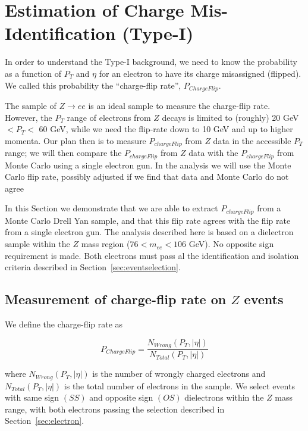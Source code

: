 \section{Estimation of Charge Mis-Identification (Type-I)}
\label{sec:chargemisid}

In order to understand the Type-I background, we need to know the 
probability as a function of $P_T$ and $\eta$ for an electron
to have its charge misassigned (flipped).  We called this 
probability the ``charge-flip rate'', $P_{ChargeFlip}$.


The sample of $Z \to ee$ is an ideal sample to measure the charge-flip rate.
However, the $P_T$ range of electrons from $Z$ decays is limited
to (roughly) 20 GeV $< P_T <$ 60 GeV, while we need the flip-rate
down to 10 GeV and up to higher momenta.
Our plan then is to measure $P_{chargeFlip}$ from $Z$ data in the 
accessible $P_T$ range;  we will then compare 
the $P_{chargeFlip}$ from $Z$ data with the $P_{chargeFlip}$ from 
Monte Carlo using a single electron gun.  In the analysis we will
use the Monte Carlo flip rate, possibly adjusted if we find that
data and Monte Carlo do not agree


In this Section we demonstrate that we are able to extract 
$P_{chargeFlip}$ from a Monte Carlo Drell Yan sample, and that
this flip rate agrees with the flip rate from a 
single electron gun.  The analysis described here is based on 
a dielectron sample within the $Z$ mass region
($76 < m_{ee} < 106 $ GeV).   No opposite sign requirement is 
made.  Both electrons must pass al the identification and isolation
criteria described in Section~\ref{sec:eventselection}.



\subsection{Measurement of charge-flip rate on $Z$ events}

We define the charge-flip rate as

\begin{equation}
P_{ChargeFlip} = \frac{N_{Wrong}(P_T, |\eta|)}{N_{Total}(P_T, |\eta|)}
\end{equation}

where $N_{Wrong}(P_T, |\eta|)$ is the number of wrongly charged electrons  
and $N_{Total}(P_T, |\eta|)$ is 
the total number of electrons in the sample. We select events with same sign $(SS)$ 
and opposite sign $(OS)$ dielectrons within the $Z$ mass range, with both electrons passing the 
selection described in Section~\ref{sec:electron}.

